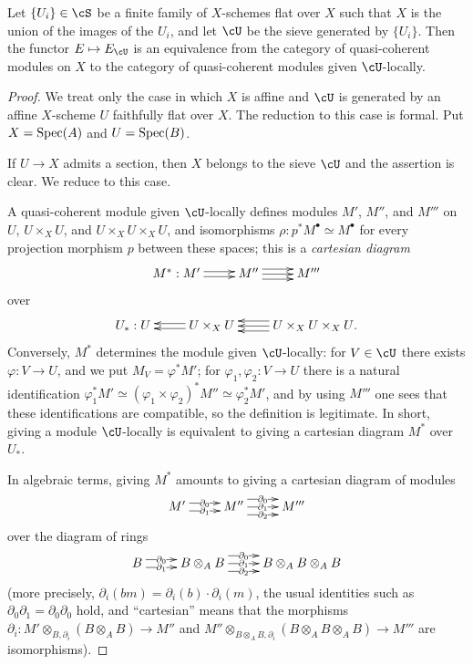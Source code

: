 \begin{theorem}\label{I:1-4-5}
Let $\{U_i\}\in\cS$ be a finite family of $X$-schemes flat over $X$
such that $X$ is the union of the images of the $U_i$, and let $\cU$
be the sieve generated by $\{U_i\}$. Then the functor
$E\mapsto E_\cU$ is an equivalence from the category of quasi-coherent
modules on $X$ to the category of quasi-coherent modules given
$\cU$-locally.
\end{theorem}
\begin{proof}
We treat only the case in which $X$ is affine and $\cU$ is generated by
an affine $X$-scheme $U$ faithfully flat over $X$. The reduction to this
case is formal. Put $X=\operatorname{Spec}(A)$ and $U=\operatorname{Spec}(B)$.

If $U\to X$ admits a section, then $X$ belongs to the sieve $\cU$ and
the assertion is clear. We reduce to this case.

A quasi-coherent module given $\cU$-locally defines modules $M'$,
$M''$, and $M'''$ on $U$, $U\times_XU$, and
$U\times_XU\times_XU$, and isomorphisms
$\rho:p^*M^\bullet\simeq M^\bullet$ for every projection morphism $p$
between these spaces; this is a \emph{cartesian diagram}
\[\xymatrix{
  M^* : M' \ar@<2pt>[r] \ar@<-2pt>[r]
    & M'' \ar[r] \ar@<4pt>[r] \ar@<-4pt>[r]
    & M'''
}\]
over
\[\xymatrix{
  U_* : U
    & U\times_X U \ar@<2pt>[l] \ar@<-2pt>[l]
    & U\times_X U\times_X U \ar[l] \ar@<4pt>[l] \ar@<-4pt>[l] \mbox{.}
}\]
Conversely, $M^*$ determines the module given $\cU$-locally: for
$V\in\cU$ there exists $\varphi:V\to U$, and we put
$M_V=\varphi^*M'$; for $\varphi_1,\varphi_2:V\to U$ there is a natural
identification
$\varphi_1^*M'\simeq(\varphi_1\times\varphi_2)^*M''\simeq\varphi_2^*M'$,
and by using $M'''$ one sees that these identifications are compatible,
so the definition is legitimate. In short, giving a module
$\cU$-locally is equivalent to giving a cartesian diagram $M^*$ over
$U_*$.

In algebraic terms, giving $M^*$ amounts to giving a cartesian diagram of
modules
\[\xymatrix{
  M' \ar@<3pt>[r]|-{\partial_0} \ar@<-3pt>[r]|-{\partial_1}
    & M'' \ar@<6pt>[r]|-{\partial_0} \ar[r]|-{\partial_1} \ar@<-6pt>[r]|-{\partial_2}
    & M'''
}\]
over the diagram of rings
\[\xymatrix{
  B \ar@<3pt>[r]|-{\partial_0} \ar@<-3pt>[r]|-{\partial_1}
    & B\otimes_A B \ar@<6pt>[r]|-{\partial_0} \ar[r]|-{\partial_1} \ar@<-6pt>[r]|-{\partial_2}
    & B\otimes_A B\otimes_A B
}\]
(more precisely, $\partial_i(bm)=\partial_i(b)\cdot\partial_i(m)$, the
usual identities such as $\partial_0\partial_1=\partial_0\partial_0$
hold, and “cartesian” means that the morphisms
$\partial_i:M'\otimes_{B,\partial_i}(B\otimes_A B)\to M''$ and
$M''\otimes_{B\otimes_A B,\partial_i}(B\otimes_A B\otimes_A B)\to M'''$
are isomorphisms).


\end{proof}
